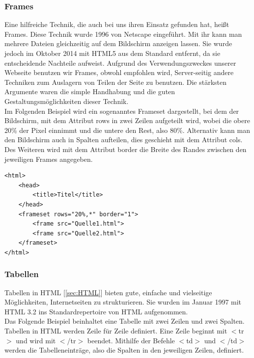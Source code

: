 \documentclass[12pt,a4paper,bibliography=totocnumbered,listof=totocnumbered]{scrartcl}
\begin{document}
\subsubsection{Frames}
\label{sec:Frames}
Eine hilfreiche Technik, die auch bei uns ihren Einsatz gefunden hat, heißt Frames. Diese Technik wurde 1996 von Netscape eingeführt. Mit ihr kann man mehrere Dateien gleichzeitig auf dem Bildschirm anzeigen lassen.\cite{HTML/Frames} Sie wurde jedoch im Oktober 2014 mit HTML5\cite{HTML5} aus dem Standard entfernt, da sie entscheidende Nachteile aufweist. Aufgrund des Verwendungszweckes unserer Webseite benutzen wir Frames, obwohl empfohlen wird, Server-seitig andere Techniken zum Auslagern von Teilen der Seite zu benutzen.\cite{HTML/Frames} Die stärksten Argumente waren die simple Handhabung und die guten Gestaltungsmöglichkeiten dieser Technik. \\
Im Folgenden Beispiel wird ein sogenanntes Frameset dargestellt, bei dem der Bildschirm, mit dem Attribut \glqq rows\grqq{} in zwei Zeilen aufgeteilt wird, wobei die obere 20\% der Pixel einnimmt und die untere den Rest, also 80\%. Alternativ kann man den Bildschirm auch in Spalten aufteilen, dies geschieht mit dem Attribut \glqq cols\grqq . Des Weiteren wird mit dem Attribut \glqq border\grqq{} die Breite des Randes zwischen den jeweiligen Frames angegeben.

\vspace{1em}
\begin{lstlisting}[caption= Beispiel für Frames in HTML, label=lst:HTML]
<html>
	<head>
		<title>Titel</title>
	</head>
	<frameset rows="20%,*" border="1">
		<frame src="Quelle1.html">
		<frame src="Quelle2.html">
	</frameset>
</html>
\end{lstlisting}

\subsubsection{Tabellen}
\label{sec:Tabellen}
Tabellen in HTML [\ref{sec:HTML}] bieten gute, einfache und vielseitige Möglichkeiten, Internetseiten zu strukturieren. Sie wurden im Januar 1997 mit HTML 3.2 ins Standardrepertoire von HTML aufgenommen.\cite{Hypertext_Markup_Language} \\
Das Folgende Beispiel beinhaltet eine Tabelle mit zwei Zeilen und zwei Spalten. Tabellen in HTML werden Zeile für Zeile definiert. Eine Zeile beginnt mit $<$tr$>$ und wird mit $<$/tr$>$ beendet. Mithilfe der Befehle $<$td$>$ und $<$/td$>$ werden die Tabelleneinträge, also die Spalten in den jeweiligen Zeilen, definiert.
\end{document}
